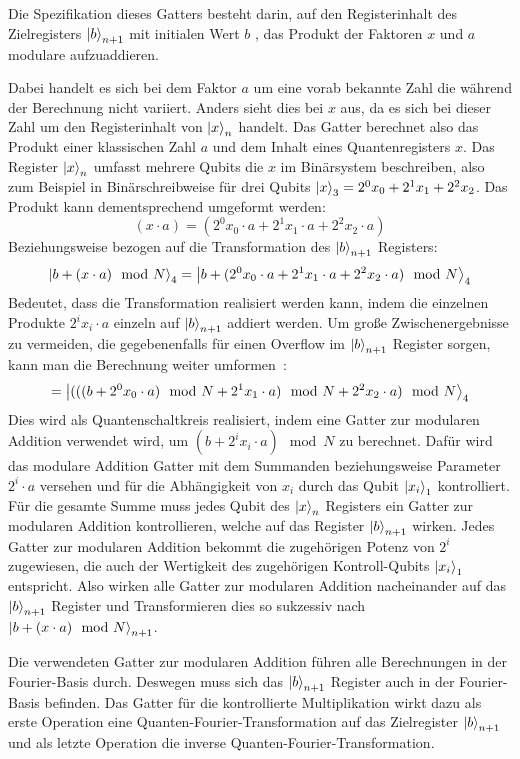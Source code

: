 Die Spezifikation dieses Gatters besteht darin, 
auf den Registerinhalt des Zielregisters \(\ket{b}_{n+1}\) mit initialen Wert \(b\) , 
das Produkt der Faktoren \(x\) und \(a\) modulare aufzuaddieren.

Dabei handelt es sich bei dem Faktor \(a\) um eine vorab bekannte Zahl die während der Berechnung nicht variiert.
Anders sieht dies bei \(x\) aus, da es sich bei dieser Zahl um den Registerinhalt von \(\ket{x}_{n}\) handelt.
Das Gatter berechnet also das Produkt einer klassischen Zahl \(a\) und dem Inhalt eines Quantenregisters \(x\).
Das Register \(\ket{x}_{n}\) umfasst mehrere Qubits die \(x\) im Binärsystem beschreiben, 
also zum Beispiel in Binärschreibweise für drei Qubits \(\ket{x}_{3} = 2^0x_0+2^1x_1+2^2x_2\).
Das Produkt kann dementsprechend umgeformt werden: 
\[(x\cdot a)  = (2^0x_0\cdot a+2^1x_1\cdot a+2^2x_2\cdot a) \]
Beziehungsweise bezogen auf die Transformation des \(\ket{b}_{n+1}\) Registers:
\[\ket{b + (x\cdot a) \mod N}_{4} = \ket{b + (2^0x_0\cdot a+2^1x_1\cdot a+2^2x_2\cdot a) \mod N}_{4}\]
Bedeutet, dass die Transformation realisiert werden kann, 
indem die einzelnen Produkte \(2^ix_i\cdot a\) einzeln auf \(\ket{b}_{n+1}\) addiert werden.
Um große Zwischenergebnisse zu vermeiden, die gegebenenfalls für einen Overflow im \(\ket{b}_{n+1}\) Register sorgen, 
kann man die Berechnung weiter umformen~\cite{beauregard2003circuit}:
\[= \ket{(((b + 2^0x_0\cdot a)\mod N+2^1x_1\cdot a)\mod N+2^2x_2\cdot a) \mod N}_{4}\]
Dies wird als Quantenschaltkreis realisiert, 
indem eine Gatter zur modularen Addition verwendet wird, 
um \((b + 2^ix_i\cdot a)\mod N\) zu berechnet.
Dafür wird das modulare Addition Gatter mit dem Summanden beziehungsweise Parameter \(2^i\cdot a\) versehen 
und für die Abhängigkeit von \(x_i\) durch das Qubit \(\ket{x_i}_1\) kontrolliert.
Für die gesamte Summe muss jedes Qubit des \(\ket{x}_{n}\) Registers ein Gatter zur modularen Addition kontrollieren, 
welche auf das Register \(\ket{b}_{n+1}\) wirken.
Jedes Gatter zur modularen Addition bekommt die zugehörigen Potenz von \(2^i\) zugewiesen, 
die auch der Wertigkeit des zugehörigen Kontroll-Qubits \(\ket{x_i}_1\) entspricht.
Also wirken alle Gatter zur modularen Addition nacheinander auf das \(\ket{b}_{n+1}\) Register und 
Transformieren dies so sukzessiv nach \(\ket{b + (x\cdot a) \mod N}_{n+1}\).

Die verwendeten Gatter zur modularen Addition führen alle Berechnungen in der Fourier-Basis durch.
Deswegen muss sich das \(\ket{b}_{n+1}\) Register auch in der Fourier-Basis befinden.
Das Gatter für die kontrollierte Multiplikation wirkt dazu als erste Operation eine Quanten-Fourier-Transformation auf 
das Zielregister \(\ket{b}_{n+1}\) und als letzte Operation die inverse Quanten-Fourier-Transformation.

